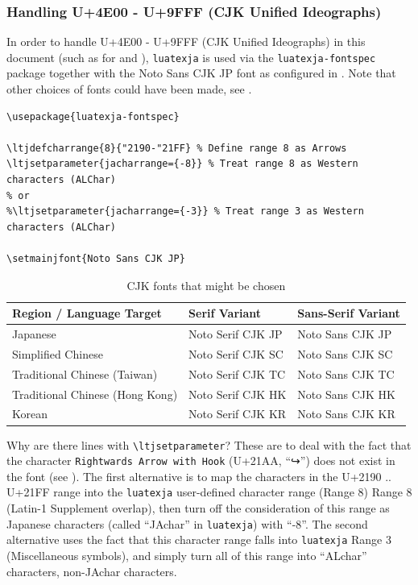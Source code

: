 \documentclass[12pt, twoside]{article}
\begin{document}
\subsubsection{Handling  U+4E00 - U+9FFF (CJK Unified Ideographs)}

In order to handle U+4E00 - U+9FFF (CJK Unified Ideographs) in this document (such as for  and ), \texttt{luatexja} is used via the \texttt{luatexja-fontspec} package together with the Noto Sans CJK JP font as configured in . Note that other choices of fonts could have been made, see .

\begin{lstlisting}[language={[LaTeX]TeX}, caption={Configuration for handling CJK Unified Ideographs}, label=lst:CJKunifiedConfiguration] 
\usepackage{luatexja-fontspec}

\ltjdefcharrange{8}{"2190-"21FF} % Define range 8 as Arrows
\ltjsetparameter{jacharrange={-8}} % Treat range 8 as Western characters (ALChar)
% or 
%\ltjsetparameter{jacharrange={-3}} % Treat range 3 as Western characters (ALChar)

\setmainjfont{Noto Sans CJK JP}
\end{lstlisting}

\begin{table}[!htp]
    \caption{CJK fonts that might be chosen}
    \label{tab:CJKalternatives}
    \begin{tabular}{l l l}
    \toprule
      \textbf{Region / Language Target} & \textbf{Serif Variant} & \textbf{Sans-Serif Variant}\\
      \midrule
Japanese & Noto Serif CJK JP & Noto Sans CJK JP\\
Simplified Chinese & Noto Serif CJK SC & Noto Sans CJK SC\\
Traditional Chinese (Taiwan) & Noto Serif CJK TC & Noto Sans CJK TC\\
Traditional Chinese (Hong Kong) & Noto Serif CJK HK & Noto Sans CJK HK\\
Korean & Noto Serif CJK KR & Noto Sans CJK KR\\
\bottomrule
\end{tabular}
\end{table}

Why are there lines with \texttt{\textbackslash ltjsetparameter}? These are to deal with the fact that the character \texttt{Rightwards Arrow with Hook} (U+21AA, \ie \enquote{\mystixmathfont ↪}) does not exist in the font (see ). The first alternative is to map the characters in the U+2190 .. U+21FF range into the \texttt{luatexja} user-defined character range (Range 8) Range 8 (\hbox{Latin-1} Supplement overlap), then turn off the consideration of this range as Japanese characters (called \enquote{JAchar} in \texttt{luatexja}) with \enquote{-8}. The second alternative uses the fact that this character range falls into \texttt{luatexja} Range 3 (Miscellaneous symbols), and simply turn all of this range into \enquote{ALchar} characters, \ie non-JAchar characters.
\end{document}
